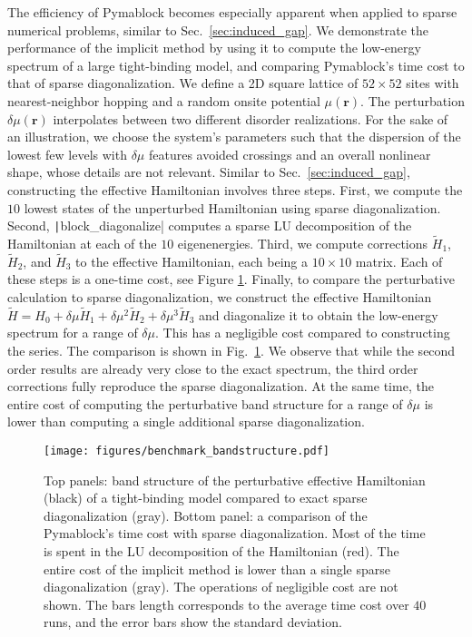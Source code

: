 The efficiency of Pymablock becomes especially apparent when applied to sparse numerical problems, similar to Sec.~\ref{sec:induced_gap}.
We demonstrate the performance of the implicit method by using it to compute the low-energy spectrum of a large tight-binding model, and comparing Pymablock's time cost to that of sparse diagonalization.
We define a 2D square lattice of $52 \times 52$ sites with nearest-neighbor hopping and a random onsite potential $\mu(\mathbf{r})$.
The perturbation $\delta \mu (\mathbf{r})$ interpolates between two different disorder realizations.
For the sake of an illustration, we choose the system's parameters such that the dispersion of the lowest few levels with $\delta \mu$ features avoided crossings and an overall nonlinear shape, whose details are not relevant.
Similar to Sec.~\ref{sec:induced_gap}, constructing the effective Hamiltonian involves three steps.
First, we compute the $10$ lowest states of the unperturbed Hamiltonian using sparse diagonalization.
Second, \texttt|block_diagonalize| computes a sparse LU decomposition of the Hamiltonian at each of the $10$ eigenenergies.
Third, we compute corrections $\tilde{H}_1$, $\tilde{H}_2$, and $\tilde{H}_3$ to the effective Hamiltonian, each being a $10 \times 10$ matrix.
Each of these steps is a one-time cost, see Figure \ref{fig:benchmark_bandstructure}.
Finally, to compare the perturbative calculation to sparse diagonalization, we construct the effective Hamiltonian $\tilde{H} = H_0 + \delta \mu \tilde{H}_1 + \delta \mu^2 \tilde{H}_2 + \delta \mu^3 \tilde{H}_3$ and diagonalize it to obtain the low-energy spectrum for a range of $\delta \mu$.
This has a negligible cost compared to constructing the series.
The comparison is shown in Fig.~\ref{fig:benchmark_bandstructure}.
We observe that while the second order results are already very close to the exact spectrum, the third order corrections fully reproduce the sparse diagonalization.
At the same time, the entire cost of computing the perturbative band structure for a range of $\delta \mu$ is lower than computing a single additional sparse diagonalization.
%
\begin{figure}[h]
    \centering
    \texttt{[image: figures/benchmark\_bandstructure.pdf]}
    \caption{
        Top panels: band structure of the perturbative effective Hamiltonian (black) of a tight-binding model compared to exact sparse diagonalization (gray).
        Bottom panel: a comparison of the Pymablock's time cost with sparse diagonalization.
        Most of the time is spent in the LU decomposition of the Hamiltonian (red).
        The entire cost of the implicit method is lower than a single sparse diagonalization (gray).
        The operations of negligible cost are not shown.
        The bars length corresponds to the average time cost over $40$ runs, and the error bars show the standard deviation.
        }
    \label{fig:benchmark_bandstructure}
\end{figure}
